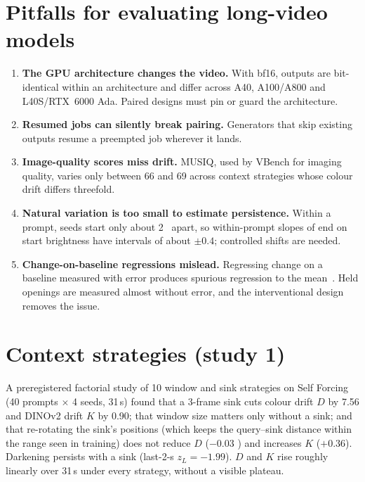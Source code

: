 \section{Pitfalls for evaluating long-video models}\label{app:pitfalls}
\begin{enumerate}
\item \textbf{The GPU architecture changes the video.} With bf16, outputs are bit-identical within an architecture and
differ across A40, A100/A800 and L40S/RTX~6000 Ada. Paired designs must pin or guard the architecture.
\item \textbf{Resumed jobs can silently break pairing.} Generators that skip existing outputs resume a preempted job
wherever it lands.
\item \textbf{Image-quality scores miss drift.} MUSIQ, used by VBench for imaging quality, varies only between 66 and 69
across context strategies whose colour drift differs threefold.
\item \textbf{Natural variation is too small to estimate persistence.} Within a prompt, seeds start only about 2~\Lstar{}
apart, so within-prompt slopes of end on start brightness have intervals of about $\pm0.4$; controlled shifts are needed.
\item \textbf{Change-on-baseline regressions mislead.} Regressing change on a baseline measured with error produces
spurious regression to the mean~\cite{oldham,barnett}. Held openings are measured almost without error, and the
interventional design removes the issue.
\end{enumerate}

\section{Context strategies (study 1)}\label{app:ctx}
A preregistered factorial study of 10 window and sink strategies on Self Forcing (40 prompts $\times$ 4 seeds, 31\,s)
found that a 3-frame sink cuts colour drift $D$ by 7.56  and DINOv2 drift $K$ by 0.90; that window size
matters only without a sink; and that re-rotating the sink's positions (which keeps the query--sink distance within the range seen in training) does
not reduce $D$ ($-0.03$ ) and increases $K$ ($+0.36$). Darkening persists with a sink (last-2-s $z_L =
-1.99$). $D$ and $K$ rise roughly linearly over 31\,s under every strategy, without a visible plateau.

